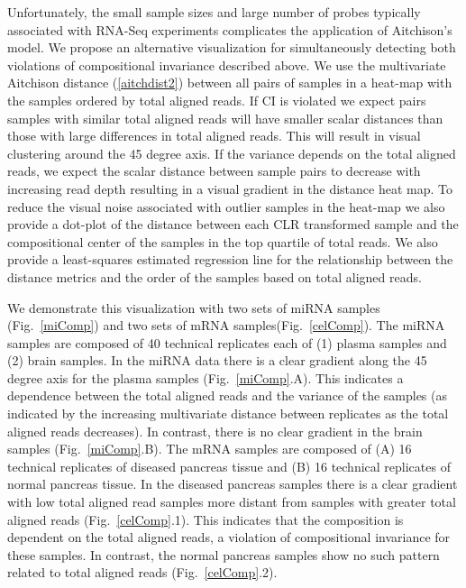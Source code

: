 Unfortunately, the small sample sizes and large number of probes typically associated with RNA-Seq experiments complicates the application of Aitchison's model.  
We propose an alternative visualization for simultaneously detecting both violations of compositional invariance described above. We use the multivariate Aitchison distance (\ref{aitchdist2}) between all pairs of samples in a heat-map with the samples ordered by total aligned reads.  If CI is violated we expect pairs samples with similar total aligned reads will have smaller scalar distances than those with large differences in total aligned reads.  This will result in visual clustering around the 45 degree axis. If the variance depends on the total aligned reads, we expect the scalar distance between sample pairs to decrease with increasing read depth resulting in a visual gradient in the distance heat map.  To reduce the visual noise associated with outlier samples in the heat-map we also provide a dot-plot of the distance between each CLR transformed sample and the compositional center of the samples in the top quartile of total reads. We also provide a least-squares estimated regression line for the relationship between the distance metrics and the order of the samples based on total aligned reads.

We demonstrate this visualization with two sets of miRNA samples (Fig.~\ref{miComp}) and two sets of mRNA samples(Fig.~\ref{celComp}).  The miRNA samples are composed of 40 technical replicates each of (1) plasma samples and (2) brain samples.  In the miRNA data there is a clear gradient along the 45 degree axis for the plasma samples (Fig.~\ref{miComp}.A).  This indicates a dependence between the total aligned reads and the variance of the samples (as indicated by the increasing multivariate distance between replicates as the total aligned reads decreases).  In contrast, there is no clear gradient in the brain samples (Fig.~\ref{miComp}.B).  The mRNA samples are composed of (A) 16 technical replicates of diseased pancreas tissue and (B) 16 technical replicates of normal pancreas tissue.  In the diseased pancreas samples there is a clear gradient with low total aligned read samples more distant from samples with greater total aligned reads (Fig.~\ref{celComp}.1).  This indicates that the composition is dependent on the total aligned reads, a violation of compositional invariance for these samples.  In contrast, the normal pancreas samples show no such pattern related to total aligned reads (Fig.~\ref{celComp}.2).

